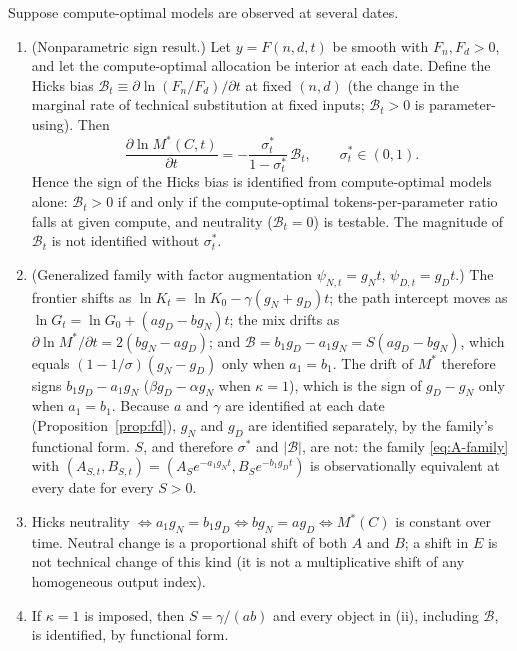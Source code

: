 \begin{proposition}\label{prop:A-dmr}
Suppose compute-optimal models are observed at several dates.
\begin{enumerate}
\item[(i)] (Nonparametric sign result.) Let $y=F(n,d,t)$ be smooth with $F_n,F_d>0$, and let the compute-optimal
allocation be interior at each date. Define the Hicks bias $\mathcal B_t\equiv\partial\ln(F_n/F_d)/\partial t$ at fixed $(n,d)$
(the change in the marginal rate of technical substitution at fixed inputs; $\mathcal B_t>0$ is parameter-using). Then
\begin{equation}\label{eq:A-drift}
\frac{\partial\ln M^*(C,t)}{\partial t}=-\frac{\sigma^*_t}{1-\sigma^*_t}\,\mathcal B_t,\qquad\sigma^*_t\in(0,1).
\end{equation}
Hence the sign of the Hicks bias is identified from compute-optimal models alone: $\mathcal B_t>0$ if and only if the
compute-optimal tokens-per-parameter ratio falls at given compute, and neutrality ($\mathcal B_t=0$) is testable. The magnitude of
$\mathcal B_t$ is not identified without $\sigma^*_t$.
\item[(ii)] (Generalized family with factor augmentation $\psi_{N,t}=g_Nt$, $\psi_{D,t}=g_Dt$.) The frontier shifts as
$\ln K_t=\ln K_0-\gamma(g_N+g_D)t$; the path intercept moves as $\ln G_t=\ln G_0+(ag_D-bg_N)t$; the mix drifts as
$\partial\ln M^*/\partial t=2(bg_N-ag_D)$; and $\mathcal B=b_1g_D-a_1g_N=S(ag_D-bg_N)$, which equals $(1-1/\sigma)(g_N-g_D)$ only
when $a_1=b_1$. The drift of $M^*$ therefore signs $b_1g_D-a_1g_N$ ($\beta g_D-\alpha g_N$ when $\kappa=1$), which is the
sign of $g_D-g_N$ only when $a_1=b_1$. Because $a$ and $\gamma$ are identified at each date (Proposition~\ref{prop:fd}),
$g_N$ and $g_D$ are identified separately, by the family's functional form. $S$, and therefore $\sigma^*$ and $|\mathcal B|$, are not: the family \eqref{eq:A-family} with
$(A_{S,t},B_{S,t})=(A_Se^{-a_1g_Nt},B_Se^{-b_1g_Dt})$ is observationally equivalent at every date for every $S>0$.
\item[(iii)] Hicks neutrality $\Leftrightarrow a_1g_N=b_1g_D\Leftrightarrow bg_N=ag_D\Leftrightarrow M^*(C)$ is constant
over time. Neutral change is a proportional shift of both $A$ and $B$; a shift in $E$ is not technical change of this
kind (it is not a multiplicative shift of any homogeneous output index).
\item[(iv)] If $\kappa=1$ is imposed, then $S=\gamma/(ab)$ and every object in (ii), including $\mathcal B$, is identified, by
functional form.
\end{enumerate}
\end{proposition}


